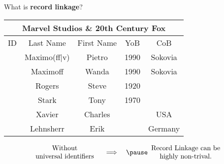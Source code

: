 \begin{frame}{\Large What is \textbf{record linkage}?}
\scriptsize
\begin{center}
\vskip -0.1cm
\begin{tabular}{|c|c|c||c|c|}
\hline
	\multicolumn{5}{|c|}{Marvel Studios \;\; \& \;\; 20th Century Fox} \\
\hline
	ID & Last Name & First Name & YoB & CoB \\
\hline
	\rowcolor{lightGray}
	\cellcolor{white} & Maximo{\color{red}(ff|v)} & Pietro & 1990 & Sokovia \\
\hline
	\rowcolor{lightGray}
	\cellcolor{white} & Maximo{\color{red}ff} & Wanda & 1990 & Sokovia \\
\hline
	\rowcolor{bgOrange}
	\cellcolor{white} & Rogers & Steve & 1920 & \\
\hline
	\rowcolor{bgOrange}
	\cellcolor{white} & Stark & Tony & 1970 & \\
\hline
	\rowcolor{lightTurquoise}
	\cellcolor{white} & Xavier & Charles & & USA \\
\hline
	\rowcolor{lightTurquoise}
	\cellcolor{white} & Lehnsherr & Erik & & Germany \\
\hline
\end{tabular}
\end{center}

\vskip -0.1cm

\large
\begin{equation*}
\begin{array}{c}
	\textnormal{Without} \\
	\textnormal{universal identifiers}
\end{array}
\quad
\Longrightarrow
\quad
\pause
\begin{array}{c}
	\textnormal{Record Linkage can be} \\
	\textnormal{highly non-trival.}
\end{array}
\end{equation*}

\end{frame}
\normalsize


